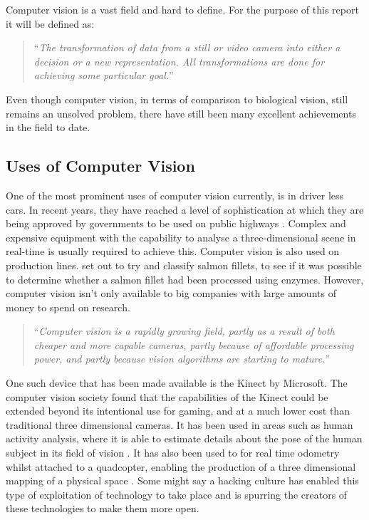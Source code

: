 \documentclass[11pt,oneside]{report}
\begin{document}
				
				Computer vision is a vast field and hard to define.
				For the purpose of this report it will be defined as:
	
				\begin{quote}
					``\textit{The transformation of data from a still or video camera into either a decision or a new representation.
						All transformations are done for achieving some particular goal.}'' \cite[p. 2]{definition:cv}
				\end{quote}
				
				Even though computer vision, in terms of comparison to biological vision, still remains an unsolved problem, there have still been many excellent achievements in the field to date.
			\subsection{Uses of Computer Vision}
				One of the most prominent uses of computer vision currently, is in driver less cars.
				In recent years, they have reached a level of sophistication at which they are being approved by governments to be used on public highways \cite{web:driverlessCars}.
				Complex and expensive equipment with the capability to analyse a three-dimensional scene in real-time is usually required to achieve this.
				Computer vision is also used on production lines.
				 set out to try and classify salmon fillets, to see if it was possible to determine whether a salmon fillet had been processed using enzymes. %
				However, computer vision isn't only available to big companies with large amounts of money to spend on research.
				\begin{quote}
				``\textit{Computer vision is a rapidly growing field, partly as a result of both cheaper and more capable cameras, partly because of affordable processing power, and partly because vision algorithms are starting to mature.}''\cite[p. ix]{definition:cv}
				\end{quote}
				One such device that has been made available is the Kinect by Microsoft.
				The computer vision society found that the capabilities of the Kinect could be extended beyond its intentional use for gaming, and at a much lower cost than traditional three dimensional cameras.
				It has been used in areas such as human activity analysis, where it is able to estimate details about the pose of the human subject in its field of vision \cite{kinect:1}.
				It has also been used to for real time odometry whilst attached to a quadcopter, enabling the production of a three dimensional mapping of a physical space \cite{kinect:2}.
				Some might say a hacking culture has enabled this type of exploitation of technology to take place and is spurring the creators of these technologies to make them more open.
				
\end{document}
